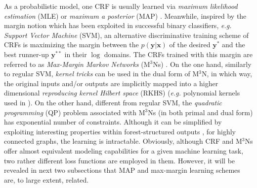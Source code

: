 As a probabilistic model, one CRF is usually 
learned via \emph{maximum likelihood estimation} (MLE) or \emph{maximum a posterior} (MAP) \citep{Kumar03,CRF,Accelerated_CRF}. 
Meanwhile, inspired by the margin notion which has been exploited in successful binary classifiers, \emph{e.g.} \emph{Support Vector Machine} (SVM),  
an alternative discriminative training scheme of CRFs is maximizing the margin between 
the $p(\mathbf{y|x})$ of the desired $\mathbf{y^*}$ and the best runner-up $\mathbf{y}^{**}$  in their $\log$ domains. The CRFs trained with this 
margin
are referred to as 
\emph{Max-Margin Markov Networks} (M$^3$Ns) \citep{Taskar03}. 
On the one hand, similarly to regular SVM, \emph{kernel tricks} can be used in the dual form of M$^3$N, in which way, the original inputs and/or outputs are implicitly mapped into a higher 
dimensional \emph{reproducing kernel Hilbert space} (RKHS) (\emph{e.g.} polynomial kernels used in \citep{Taskar03}).     
On the other hand, different from regular SVM, the \emph{quadratic programming} 
(QP) problem associated with M$^3$Ns (in both primal and dual form) has exponential number of constraints. 
Although it can be simplified by exploiting interesting properties within forest-structured outputs \citep{Taskar03},  
for highly connected graphs, the learning is intractable.      
Obviously, although CRF and  M$^3$Ns offer almost equivalent modeling capabilities for a given machine learning task, two rather different loss functions are 
employed in them. However, it will be revealed in next two subsections that MAP and max-margin learning schemes are, to large extent, related. 
